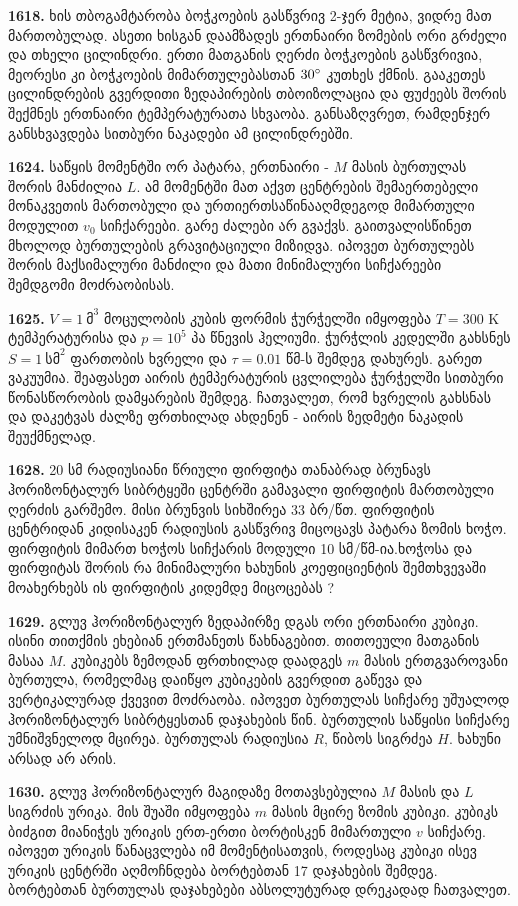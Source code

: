\documentclass[12pt,a4paper,]{report}
\begin{document}
\textbf{1618.} ხის თბოგამტარობა ბოჭკოების გასწვრივ 2-ჯერ მეტია, ვიდრე მათ მართობულად. ასეთი ხისგან დაამზადეს ერთნაირი ზომების ორი გრძელი და თხელი ცილინდრი. ერთი მათგანის ღერძი ბოჭკოების გასწვრივია, მეორესი კი ბოჭკოების მიმართულებასთან $30 \degree$ კუთხეს ქმნის. გააკეთეს ცილინდრების გვერდითი ზედაპირების თბოიზოლაცია და ფუძეებს შორის შექმნეს ერთნაირი ტემპერატურათა სხვაობა. განსაზღვრეთ, რამდენჯერ განსხვავდება სითბური ნაკადები ამ ცილინდრებში.

\textbf{1624.} საწყის მომენტში ორ პატარა, ერთნაირი - $M$ მასის ბურთულას შორის მანძილია $L$. ამ მომენტში მათ აქვთ ცენტრების შემაერთებელი მონაკვეთის მართობული და ურთიერთსაწინააღმდეგოდ მიმართული მოდულით $v_0$ სიჩქარეები. გარე ძალები არ გვაქვს. გაითვალისწინეთ მხოლოდ ბურთულების გრავიტაციული მიზიდვა. იპოვეთ ბურთულებს შორის მაქსიმალური მანძილი და მათი მინიმალური სიჩქარეები შემდგომი მოძრაობისას. 

\textbf{1625.} $V=1\ \text{მ}^3$ მოცულობის კუბის ფორმის ჭურჭელში იმყოფება $T=300$ K ტემპერატურისა და $p=10^5$ პა წნევის ჰელიუმი. ჭურჭლის კედელში გახსნეს $S=1\ \text{სმ}^2$ ფართობის ხვრელი და $\tau=0.01$ წმ-ს შემდეგ დახურეს. გარეთ ვაკუუმია. შეაფასეთ აირის ტემპერატურის ცვლილება ჭურჭელში სითბური წონასწორობის დამყარების შემდეგ. ჩათვალეთ, რომ ხვრელის გახსნას და დაკეტვას ძალზე ფრთხილად ახდენენ - აირის ზედმეტი ნაკადის შეუქმნელად.

\textbf{1628.} 20 სმ რადიუსიანი წრიული ფირფიტა თანაბრად ბრუნავს ჰორიზონტალურ სიბრტყეში ცენტრში გამავალი ფირფიტის მართობული ღერძის გარშემო. მისი ბრუნვის სიხშირეა 33 ბრ/წთ. ფირფიტის ცენტრიდან კიდისაკენ რადიუსის გასწვრივ მიცოცავს პატარა ზომის ხოჭო. ფირფიტის მიმართ ხოჭოს სიჩქარის მოდული 10 სმ/წმ-ია.ხოჭოსა და ფირფიტას შორის რა მინიმალური ხახუნის კოეფიციენტის შემთხვევაში მოახერხებს ის ფირფიტის კიდემდე მიცოცებას ?

\textbf{1629.} გლუვ ჰორიზონტალურ ზედაპირზე დგას ორი ერთნაირი კუბიკი. ისინი თითქმის ეხებიან ერთმანეთს წახნაგებით. თითოეული მათგანის მასაა $M$. კუბიკებს ზემოდან ფრთხილად დაადგეს $m$ მასის ერთგვაროვანი ბურთულა, რომელმაც დაიწყო კუბიკების გვერდით გაწევა და ვერტიკალურად ქვევით მოძრაობა. იპოვეთ ბურთულას სიჩქარე უშუალოდ ჰორიზონტალურ სიბრტყესთან დაჯახების წინ. ბურთულის საწყისი სიჩქარე უმნიშვნელოდ მცირეა. ბურთულას რადიუსია $R$, წიბოს სიგრძეა $H$. ხახუნი არსად არ არის.  

\textbf{1630.} გლუვ ჰორიზონტალურ მაგიდაზე მოთავსებულია $M$ მასის და $L$ სიგრძის ურიკა. მის შუაში იმყოფება $m$ მასის მცირე ზომის კუბიკი. კუბიკს ბიძგით მიანიჭეს ურიკის ერთ-ერთი ბორტისკენ მიმართული $v$ სიჩქარე. იპოვეთ ურიკის წანაცვლება იმ მომენტისათვის, როდესაც კუბიკი ისევ ურიკის ცენტრში აღმოჩნდება ბორტებთან 17 დაჯახების შემდეგ. ბორტებთან ბურთულას დაჯახებები აბსოლუტურად დრეკადად ჩათვალეთ.
\end{document}
